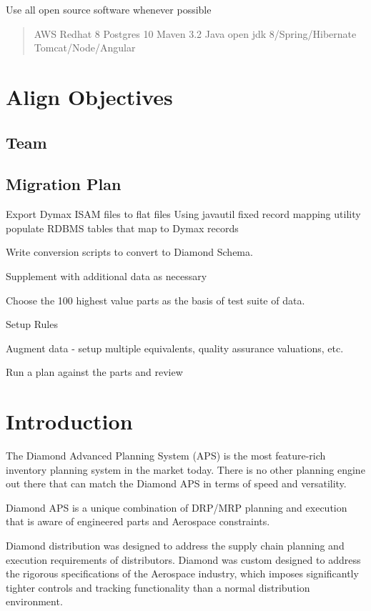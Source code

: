 \documentclass[letterpaper,10pt,english]{sphinxmanual}
\begin{document}
Use all open source software whenever possible
\begin{quote}

AWS
Redhat 8
Postgres 10
Maven 3.2
Java open jdk 8/Spring/Hibernate
Tomcat/Node/Angular
\end{quote}


\chapter{Align Objectives}
\label{\detokenize{index:align-objectives}}

\section{Team}
\label{\detokenize{index:team}}

\section{Migration Plan}
\label{\detokenize{index:migration-plan}}
Export Dymax ISAM files to flat files
Using javautil fixed record mapping utility populate RDBMS tables that map to Dymax records

Write conversion scripts to convert to Diamond Schema.

Supplement with additional data as necessary

Choose the 100 highest value parts as the basis of test suite of data.

Setup Rules

Augment data - setup multiple equivalents, quality assurance valuations, etc.

Run a plan against the parts and review


\chapter{Introduction}
\label{\detokenize{index:introduction}}
The Diamond Advanced Planning System (APS) is the most feature-rich
inventory planning system in the market today. There is no other
planning engine out there that can match the Diamond APS in terms of
speed and versatility.

Diamond APS is a unique combination of DRP/MRP planning and execution that is aware
of engineered parts and Aerospace constraints.

Diamond distribution was designed to address the
supply chain planning and execution requirements of distributors.
Diamond was custom designed to address the rigorous specifications of
the Aerospace industry, which imposes significantly tighter controls and
tracking functionality than a normal distribution environment.
\end{document}
